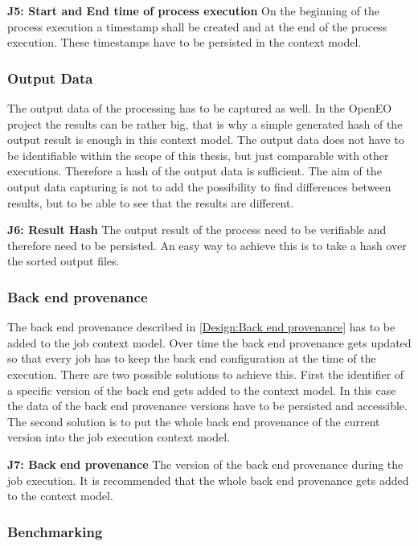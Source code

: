 \documentclass[draft,final]{vutinfth} %
\begin{document}
\textbf{J5: Start and End time of process execution}
On the beginning of the process execution a timestamp shall  be created and at the end of the process execution. These timestamps have to be persisted in the context model.

\subsubsection{Output Data}\label{Job:Output Data}
The output data of the processing has to be captured as well. In the OpenEO project the results can be rather big, that is why a simple generated hash of the output result is enough in this context model. The output data does not have to be identifiable within the scope of this thesis, but just comparable with other executions. Therefore a hash of the output data is sufficient. The aim of the output data capturing is not to add the possibility to find differences between results, but to be able to see that the results are different. 

\textbf{J6: Result Hash}
The output result of the process need to be verifiable and therefore need to be persisted. An easy way to achieve this is to take a hash over the sorted output files. 

\subsubsection{Back end provenance}\label{Job:Back end provenance}
The back end provenance described in \ref{Design:Back end provenance} has to be added to the job context model. Over time the back end provenance gets updated so that every job has to keep the back end configuration at the time of the execution. There are two possible solutions to achieve this. First the  identifier of a specific version of the back end gets added to the context model. In this case the data of the back end provenance versions have to be persisted and accessible. The second solution is to put the whole back end provenance of the current version into the job execution context model.

\textbf{J7: Back end provenance} 
The version of the back end provenance during the job execution. It is recommended that  the whole back end provenance gets added to the context model.

\subsubsection{Benchmarking}\label{Job:Benchmarking}
\end{document}
